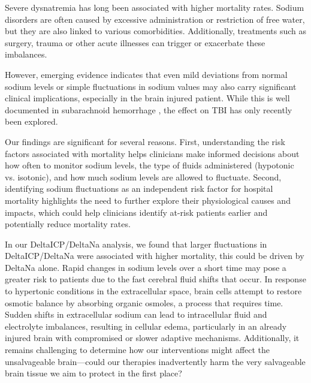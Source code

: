 Severe dysnatremia has long been associated with higher mortality rates. Sodium disorders are often caused by excessive administration or restriction of free water, but they are also linked to various comorbidities. Additionally, treatments such as surgery\cite{marshallAssociationSodiumFluctuations2017}\cite{sakrFluctuationsSerumSodium2013}, trauma or other acute illnesses\cite{senSodiumVariabilityAssociated2017a} can trigger or exacerbate these imbalances.

However, emerging evidence\cite{darmonPrognosticConsequencesBorderline2013} indicates that even mild deviations from normal sodium levels or simple fluctuations in sodium values may also carry significant clinical implications, especially in the brain injured patient. While this is well documented in subarachnoid hemorrhage \cite{jinAssociationSerumSodium2022}\cite{labibSodiumItsImpact2024}\cite{balesEffectHyponatremiaSodium2016}\cite{topjianGreaterFluctuationsSerum2014}\cite{eaglesSignificanceFluctuationsSerum2019}\cite{haradaImpactHormonalDynamics2022}, the effect on TBI has only recently been explored\cite{harroisVariabilitySerumSodium2021a}.

Our findings are significant for several reasons. First, understanding the risk factors associated with mortality helps clinicians make informed decisions about how often to monitor sodium levels, the type of fluids administered (hypotonic vs. isotonic), and how much sodium levels are allowed to fluctuate. Second, identifying sodium fluctuations as an independent risk factor for hospital mortality highlights the need to further explore their physiological causes and impacts, which could help clinicians identify at-risk patients earlier and potentially reduce mortality rates.

In our DeltaICP/DeltaNa analysis, we found that larger fluctuations in DeltaICP/DeltaNa were associated with higher mortality, this could be driven by DeltaNa alone. Rapid changes in sodium levels over a short time may pose a greater risk to patients due to the fast cerebral fluid shifts that occur. In response to hypertonic conditions in the extracellular space, brain cells attempt to restore osmotic balance by absorbing organic osmoles, a process that requires time. Sudden shifts in extracellular sodium can lead to intracellular fluid and electrolyte imbalances, resulting in cellular edema, particularly in an already injured brain with compromised or slower adaptive mechanisms. Additionally, it remains challenging to determine how our interventions might affect the unsalvageable brain—could our therapies inadvertently harm the very salvageable brain tissue we aim to protect in the first place?

